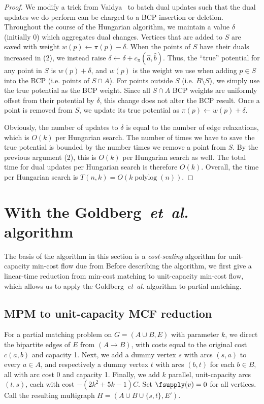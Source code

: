 \documentclass[11pt]{article}
\def\etal{\textsl{et~al.}}
\def\polylog{\mathop{\mathrm{polylog}}}
\theoremstyle{plain}
\begin{document}
\begin{proof}
	We modify a trick from Vaidya~%
	to batch dual updates such that the dual updates we do perform can be 
	charged to a BCP insertion or deletion.
	Throughout the course of the Hungarian algorithm, we maintain a value
	$\delta$ (initially 0) which aggregates dual changes.
	Vertices that are added to $S$ are saved with weight 
	$w(p) \gets \pi(p) - \delta$.
	When the points of $S$ have their duals increased in (2), we instead
	raise $\delta \gets \delta + c_\pi(\hat{a}, \hat{b})$.
	Thus, the ``true'' potential for any point in $S$ is $w(p) + \delta$,
	and $w(p)$ is the weight we use when adding $p \in S$ into the BCP
	(i.e. points of $S \cap A$).
	For points outside $S$ (i.e. $B \setminus S$), we simply use the true 
	potential as the BCP weight.
	Since all $S \cap A$ BCP weights are uniformly offset from their 
	potential by $\delta$, this change does not alter the BCP result.
	Once a point is removed from $S$, we update its true potential
	as $\pi(p) \gets w(p) + \delta$.

	Obviously, the number of updates to $\delta$ is equal to the number of 
	edge relaxations, which is $O(k)$ per Hungarian search.
	The number of times we have to save the true potential is bounded by
	the number times we remove a point from $S$.
	By the previous argument (2), this is $O(k)$ per Hungarian search as 
	well.
	The total time for dual updates per Hungarian search is therefore 
	$O(k)$.
	Overall, the time per Hungarian search is $T(n, k) = O(k\polylog(n))$.
\end{proof}


\section{With the Goldberg~{\etal} algorithm}
\label{section:goldberg}

The basis of the algorithm in this section is a \emph{cost-scaling} algorithm 
for unit-capacity min-cost flow due from %
Before describing the algorithm, we first give a linear-time reduction from 
min-cost matching to unit-capacity min-cost flow, which allows us to apply the 
Goldberg~{\etal} algorithm to partial matching.

\subsection{MPM to unit-capacity MCF reduction}
\label{subsection:mcm_mcf_reduction}

For a partial matching problem on $G = (A \cup B, E)$ with parameter $k$, we 
direct the bipartite edges of $E$ from $(A \to B)$, with costs equal to the 
original cost $c(a, b)$ and capacity 1.
Next, we add a dummy vertex $s$ with arcs $(s, a)$ to every $a \in A$,
and respectively a dummy vertex $t$ with arcs $(b, t)$ for each $b \in B$,
all with arc cost 0 and capacity 1.
Finally, we add $k$ parallel, unit-capacity arcs $(t, s)$, each with cost 
$-(2k^2 + 5k - 1)C$. 
Set $\fsupply(v) = 0$ for all vertices.
Call the resulting multigraph $H = (A \cup B \cup \{s, t\}, E')$.
\end{document}
